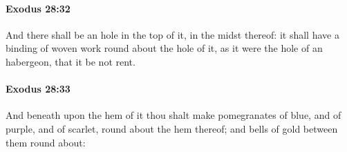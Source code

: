 		\paragraph{Exodus 28:32} %
			\label{EXODUS-28-32}

			And there shall be an hole in the top of it, in the midst thereof: it shall have a binding of woven work round about the hole of it, as it were the hole of an habergeon, that it be not rent.


		\paragraph{Exodus 28:33} %
			\label{EXODUS-28-33}

			And beneath upon the hem of it thou shalt make pomegranates of blue, and of purple, and of scarlet, round about the hem thereof; and bells of gold between them round about:


